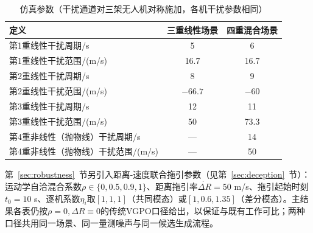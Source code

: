 \documentclass[UTF8,a4paper,zihao=-4]{ctexart}
\begin{document}
\begin{table}[htbp]
\centering
\caption{仿真参数（干扰通道对三架无人机对称施加，各机干扰参数相同）}\label{tab:parameters}
\begin{tabularx}{0.85\linewidth}{@{}Xcc@{}}
\toprule
定义 & 三重线性场景 & 四重混合场景\\
\midrule
第1重线性干扰周期/s & 5 & 6\\
第1重线性干扰范围/(m/s) & 16.7 & 16.7\\
第2重线性干扰周期/s & 8 & 9\\
第2重线性干扰范围/(m/s) & $-66.7$ & $-60$\\
第3重线性干扰周期/s & 12 & 11\\
第3重线性干扰范围/(m/s) & 50 & 73.3\\
第4重非线性（抛物线）干扰周期/s & — & 14\\
第4重非线性（抛物线）干扰范围/(m/s) & — & 50\\
\bottomrule
\end{tabularx}
\end{table}

第~\ref{sec:robustness}~节另引入距离-速度联合拖引参数（见第~\ref{sec:deception}~节）：运动学自洽混合系数\(\rho\in\{0,0.5,0.9,1\}\)、距离拖引率\(\dot{\Delta R}=50\) m/s、拖引起始时刻\(t_0=10\) s、逐机系数\(\eta_i\)取\([1,1,1]\)（共同模态）或\([1,0.6,1.35]\)（差分模态）。主结果各表仍按\(\rho=0,\Delta R\equiv0\)的传统VGPO口径给出，以保证与既有工作可比；两种口径共用同一场景、同一量测噪声与同一候选生成流程。
\end{document}
